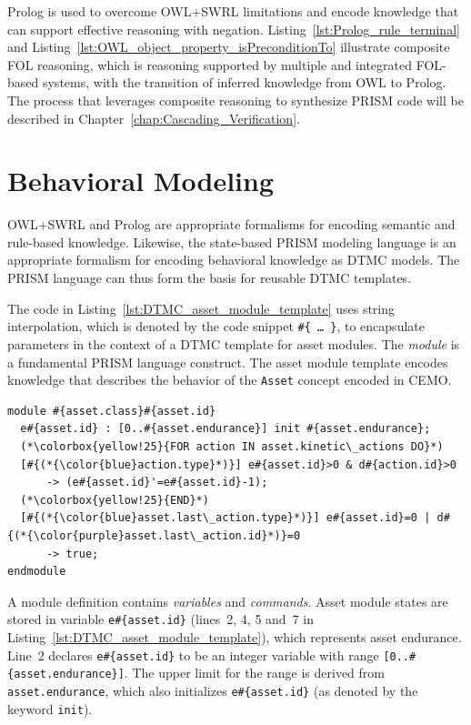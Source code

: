 Prolog is used to overcome OWL+SWRL limitations and encode knowledge that can support effective reasoning with negation. Listing~\ref{lst:Prolog_rule_terminal} and Listing~\ref{lst:OWL_object_property_isPreconditionTo} illustrate composite FOL reasoning, which is reasoning supported by multiple and integrated FOL-based systems, with the transition of inferred knowledge from OWL to Prolog. The process that leverages composite reasoning to synthesize PRISM code will be described in Chapter~\ref{chap:Cascading_Verification}.

\section{Behavioral Modeling}
\label{sec:Behavioral_Modeling}

OWL+SWRL and Prolog are appropriate formalisms for encoding semantic and rule-based knowledge. Likewise, the state-based PRISM modeling language is an appropriate formalism for encoding behavioral knowledge as DTMC models. The PRISM language can thus form the basis for reusable DTMC templates.

The code in Listing~\ref{lst:DTMC_asset_module_template} uses string interpolation, which is denoted by the code snippet \texttt{\#\{ \ldots\ \}}, to encapsulate parameters in the context of a DTMC template for asset modules. The \emph{module} is a fundamental PRISM language construct. The asset module template encodes knowledge that describes the behavior of the \texttt{Asset} concept encoded in CEMO\@.

\begin{lstlisting}[caption={DTMC template for asset modules},label=lst:DTMC_asset_module_template]
module #{asset.class}#{asset.id}
  e#{asset.id} : [0..#{asset.endurance}] init #{asset.endurance};
  (*\colorbox{yellow!25}{FOR action IN asset.kinetic\_actions DO}*)
  [#{(*{\color{blue}action.type}*)}] e#{asset.id}>0 & d#{action.id}>0
      -> (e#{asset.id}'=e#{asset.id}-1);
  (*\colorbox{yellow!25}{END}*)
  [#{(*{\color{blue}asset.last\_action.type}*)}] e#{asset.id}=0 | d#{(*{\color{purple}asset.last\_action.id}*)}=0
      -> true;
endmodule
\end{lstlisting}

A module definition contains \emph{variables} and \emph{commands}. Asset module states are stored in variable \texttt{e\#\{asset.id\}} (lines~2, 4, 5 and~7 in Listing~\ref{lst:DTMC_asset_module_template}), which represents asset endurance. Line~2 declares \texttt{e\#\{asset.id\}} to be an integer variable with range \texttt{[0..\#\{asset.endurance\}]}. The upper limit for the range is derived from \texttt{asset.en\-durance}, which also initializes \texttt{e\#\{asset.id\}} (as denoted by the keyword \texttt{init}).

